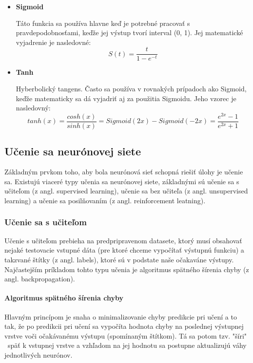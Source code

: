 \begin{itemize}
		\item{\textbf{Sigmoid}}
		
		Táto funkcia sa používa hlavne keď je potrebné pracovať s pravdepodobnosťami, keďže jej výstup tvorí interval (0, 1). Jej matematické vyjadrenie je nasledovné:
		\begin{equation}
		S(t) = \frac{t}{1-e^{-t}}
		\end{equation}
		
		\item {\textbf{Tanh}}
		
		Hyberbolický tangens. Často sa používa v rovnakých prípadoch ako Sigmoid, keďže matematicky sa dá vyjadriť aj za použitia Sigmoidu. Jeho vzorec je nasledovný:
		\begin{equation}
			tanh(x)=\frac{cosh(x)}{sinh(x)}=Sigmoid(2x)-Sigmoid(-2x)=\frac{e^{2x}-1}{e^{2x}+1}
		\end{equation}
	\end{itemize}
	
\subsection{Učenie sa neurónovej siete}
	
Základným prvkom toho, aby bola neurónová sieť schopná riešiť úlohy je učenie sa. Existujú viaceré typy učenia sa neurónovej siete, základnými sú učenie sa s učiteľom (z angl. supervised learning), učenie sa bez učiteľa (z angl. unsupervised learning\cite{unsupervised}) a učenie sa posilňovaním (z angl. reinforcement leatning\cite{mnih2013playing}). 

\subsubsection{Učenie sa s učiteľom}
Učenie s učiteľom prebieha na predpripravenom datasete, ktorý musí obsahovať nejaké testovacie vstupné dáta (pre ktoré chceme vypočítať výstupnú funkciu) a takzvané štítky (z angl. labels), ktoré sú v podstate naše očakaváne výstupy. Najčastejším príkladom tohto typu učenia je algoritmus spätného šírenia chyby (z angl. backpropagation\cite{nielsen2015neural}).

\paragraph{Algoritmus spätného šírenia chyby}
Hlavným princípom je snaha o minimalizovanie chyby predikcie pri učení a to tak, že po predikcii pri učení sa vypočíta hodnota chyby na poslednej výstupnej vrstve voči očakávanému výstupu (spomínaným štítkom). Tá sa potom tzv. "šíri" \ späť k vstupnej vrstve a vzhľadom na jej hodnotu sa postupne aktualizujú váhy jednotlivých neurónov.

